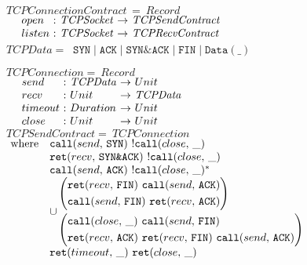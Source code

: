 \newcommand*{\tcpc}{\mathit{TCPConnection}}
\newcommand*{\tcpcc}{\mathit{TCPConnectionContract}}
\newcommand*{\tcpsock}{\mathit{TCPSocket}}
\newcommand*{\tcpsendc}{\mathit{TCPSendContract}}
\newcommand*{\tcprecvc}{\mathit{TCPRecvContract}}
\newcommand*{\tcpdata}{\mathit{TCPData}}
\newcommand*{\tcpstyle}[1]{\texttt{#1}}
\FloatBarrier
\begin{figure}
 \newcommand*{\send}[1]{\scallev{send}{#1}}
 \newcommand*{\rcv}[1]{\sretev{recv}{#1}}
 \newcommand*{\notclose}{\snonevent{\call{close}}}
 \newcommand*{\tcpsyn}{\tcpstyle{SYN}}
 \newcommand*{\tcpack}{\tcpstyle{ACK}}
 \newcommand*{\tcpsynack}{\tcpstyle{SYN\&ACK}}
 \newcommand*{\tcpfin}{\tcpstyle{FIN}}
 $\tcpcc\, =~ Record$ \\
 $\begin{array}{ @{\quad~}l@{\ :} @{~}l @{\ \to\ }l }
  open & \tcpsock & \tcpsendc \\
  listen & \tcpsock & \tcprecvc
 \end{array}$ \\
 $\tcpdata =$
 $~ \tcpsyn \mid \tcpack \mid \tcpsynack \mid \tcpfin \mid \tcpstyle{Data}(\_)$

 $\tcpc =~ Record$ \\
 $\begin{array}{ @{\quad~}l@{\ :} @{~}l@{\ \to\ } l }
  send & \tcpdata & Unit \\
  recv & Unit & \tcpdata \\
  timeout & Duration & Unit \\
  close & Unit & Unit
 \end{array}$ \\

 $\tcpsendc =~ \tcpc$ \\
 $\begin{array}{ @{~}r@{\quad} l @{}l }
  \text{where}
  &&\send{\tcpsyn}~ \notclose \\
  &&\rcv{\tcpsynack}~ \notclose \\
  &&\send{\tcpack}~ \stmany{\notclose} \\

  &&\cup
  \begin{aligned}
   &\left(
    \begin{aligned}
     &\rcv{\tcpfin}~ \send{\tcpack} \\
     &\send{\tcpfin}~ \rcv{\tcpack}
    \end{aligned}
   \right) \\
   &\left(
    \begin{aligned}
     &\call{close}~ \send{\tcpfin} \\
     &\rcv{\tcpack}~ \rcv{\tcpfin}~ \send{\tcpack}
    \end{aligned}
   \right)
  \end{aligned} \\
  &&\ret{timeout}~ \ret{close}
 \end{array}$


\end{figure}
